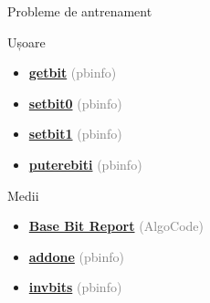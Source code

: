 ﻿\documentclass{beamer}
\begin{document}
\begin{frame}{Probleme de antrenament}
  \begin{block}{Ușoare}
    \begin{itemize}
      \item \href{https://www.pbinfo.ro/probleme/2577/getbit}{\textbf{getbit}} {\footnotesize\textcolor{gray}{(pbinfo)}}
      \item \href{https://www.pbinfo.ro/probleme/2580/setbit0}{\textbf{setbit0}} {\footnotesize\textcolor{gray}{(pbinfo)}}
      \item \href{https://www.pbinfo.ro/probleme/2581/setbit1}{\textbf{setbit1}} {\footnotesize\textcolor{gray}{(pbinfo)}}
      \item \href{https://www.pbinfo.ro/probleme/2711/puterebiti}{\textbf{puterebiti}} {\footnotesize\textcolor{gray}{(pbinfo)}}
    \end{itemize}
  \end{block}
  \begin{block}{Medii}
    \begin{itemize}
      \item \href{https://code.algolymp.com/problems/4271}{\textbf{Base Bit Report}} {\footnotesize\textcolor{gray}{(AlgoCode)}}
      \item \href{https://www.pbinfo.ro/probleme/2799/addone}{\textbf{addone}} {\footnotesize\textcolor{gray}{(pbinfo)}}
      \item \href{https://www.pbinfo.ro/probleme/2624/invbits}{\textbf{invbits}} {\footnotesize\textcolor{gray}{(pbinfo)}}
    \end{itemize}
  \end{block}
\end{frame}
\end{document}
